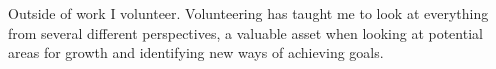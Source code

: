 Outside of work I volunteer. Volunteering has taught me to look at everything from several different perspectives, a valuable asset when looking at potential areas for growth and identifying new ways of achieving goals.
